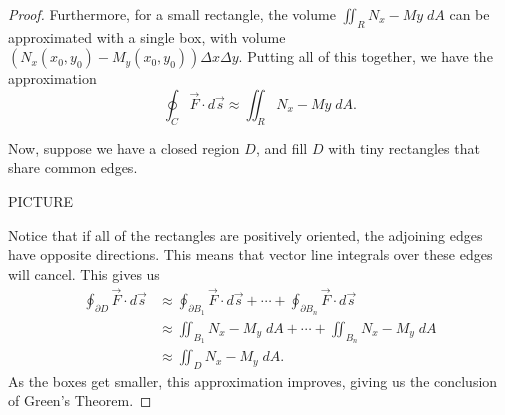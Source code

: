 \documentclass{ximera}
\begin{document}
\begin{proof}
Furthermore, for a small rectangle, the volume $\iint_R N_x-My\;dA$ can be approximated with a single box, with volume $\left(N_x(x_0,y_0)-M_y(x_0,y_0)\right) \Delta x\Delta y$. Putting all of this together, we have the approximation
\[
\oint_C\vec{F}\cdot d\vec{s}\approx\iint_R N_x-My\;dA.
\]

Now, suppose we have a closed region $D$, and fill $D$ with tiny rectangles that share common edges.

PICTURE

Notice that if all of the rectangles are positively oriented, the adjoining edges have opposite directions. This means that vector line integrals over these edges will cancel. This gives us
\begin{align*}
\oint_{\partial D}\vec{F}\cdot d\vec{s}&\approx \oint_{\partial B_1}\vec{F}\cdot d\vec{s} + \cdots + \oint_{\partial B_n}\vec{F}\cdot d\vec{s}\\
&\approx \iint_{B_1}N_x-M_y\;dA + \cdots + \iint_{B_n}N_x-M_y\;dA\\
&\approx \iint_D N_x - M_y\;dA.
\end{align*}
As the boxes get smaller, this approximation improves, giving us the conclusion of Green's Theorem.
\end{proof}
\end{document}
